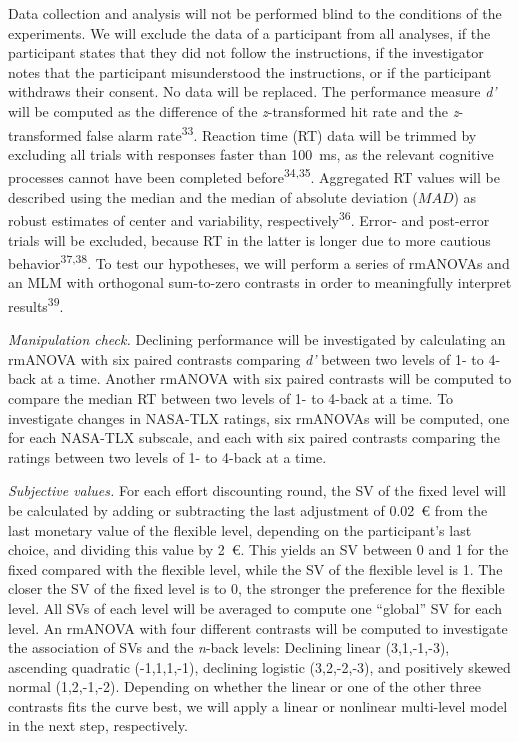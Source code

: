 \documentclass[
  man,floatsintext]{apa6}
\begin{document}
Data collection and analysis will not be performed blind to the conditions of the experiments.
We will exclude the data of a participant from all analyses, if the participant states that they did not follow the instructions, if the investigator notes that the participant misunderstood the instructions, or if the participant withdraws their consent.
No data will be replaced.
The performance measure \emph{d'} will be computed as the difference of the \emph{z}-transformed hit rate and the \emph{z}-transformed false alarm rate\textsuperscript{33}.
Reaction time (RT) data will be trimmed by excluding all trials with responses faster than 100~ms, as the relevant cognitive processes cannot have been completed before\textsuperscript{34,35}.
Aggregated RT values will be described using the median and the median of absolute deviation (\(MAD\)) as robust estimates of center and variability, respectively\textsuperscript{36}.
Error- and post-error trials will be excluded, because RT in the latter is longer due to more cautious behavior\textsuperscript{37,38}.
To test our hypotheses, we will perform a series of rmANOVAs and an MLM with orthogonal sum-to-zero contrasts in order to meaningfully interpret results\textsuperscript{39}.

\emph{Manipulation check.}
Declining performance will be investigated by calculating an rmANOVA with six paired contrasts comparing \emph{d'} between two levels of 1- to 4-back at a time.
Another rmANOVA with six paired contrasts will be computed to compare the median RT between two levels of 1- to 4-back at a time.
To investigate changes in NASA-TLX ratings, six rmANOVAs will be computed, one for each NASA-TLX subscale, and each with six paired contrasts comparing the ratings between two levels of 1- to 4-back at a time.

\emph{Subjective values.}
For each effort discounting round, the SV of the fixed level will be calculated by adding or subtracting the last adjustment of 0.02~€ from the last monetary value of the flexible level, depending on the participant's last choice, and dividing this value by 2~€.
This yields an SV between 0 and 1 for the fixed compared with the flexible level, while the SV of the flexible level is 1.
The closer the SV of the fixed level is to 0, the stronger the preference for the flexible level.
All SVs of each level will be averaged to compute one ``global'' SV for each level.
An rmANOVA with four different contrasts will be computed to investigate the association of SVs and the \emph{n}-back levels: Declining linear (3,1,-1,-3), ascending quadratic (-1,1,1,-1), declining logistic (3,2,-2,-3), and positively skewed normal (1,2,-1,-2).
Depending on whether the linear or one of the other three contrasts fits the curve best, we will apply a linear or nonlinear multi-level model in the next step, respectively.
\end{document}
